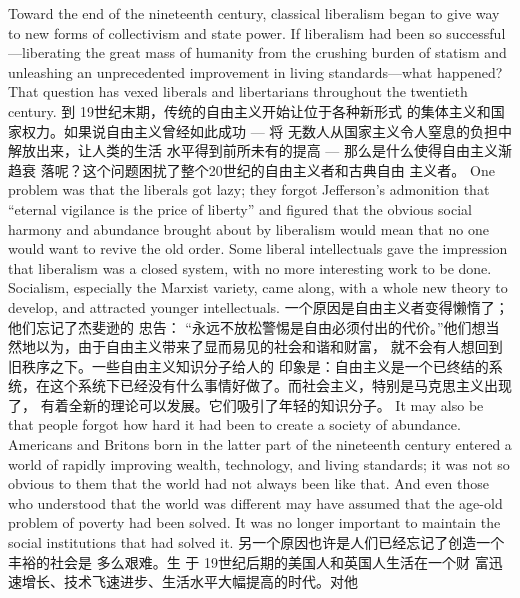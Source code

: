 \begin{paracol}{2}
Toward the end of the nineteenth century, classical liberalism
began to give way to new forms of collectivism and state power.
If liberalism had been so successful---liberating the great mass
of humanity from the crushing burden of statism and unleashing an unprecedented improvement in living standards---what
happened? That question has vexed liberals and libertarians
throughout the twentieth century.
\switchcolumn
到 19世纪末期，传统的自由主义开始让位于各种新形式
的集体主义和国家权力。如果说自由主义曾经如此成功 --- 将
无数人从国家主义令人窒息的负担中解放出来，让人类的生活
水平得到前所未有的提高 --- 那么是什么使得自由主义渐趋衰
落呢？这个问题困扰了整个20世纪的自由主义者和古典自由
主义者。
\switchcolumn*
One problem was that the liberals got lazy; they forgot Jefferson's admonition that ``eternal vigilance is the price of liberty'' and figured that the obvious social harmony and
abundance brought about by liberalism would mean that no
one would want to revive the old order. Some liberal intellectuals gave the impression that liberalism was a closed system,
with no more interesting work to be done. Socialism, especially
the Marxist variety, came along, with a whole new theory to develop, and attracted younger intellectuals.
\switchcolumn
一个原因是自由主义者变得懒惰了；他们忘记了杰斐逊的
忠告： “永远不放松警惕是自由必须付出的代价。”他们想当
然地以为，由于自由主义带来了显而易见的社会和谐和财富，
就不会有人想回到旧秩序之下。一些自由主义知识分子给人的
印象是：自由主义是一个已终结的系统，在这个系统下已经没有什么事情好做了。而社会主义，特别是马克思主义出现了，
有着全新的理论可以发展。它们吸引了年轻的知识分子。
\switchcolumn*
It may also be that people forgot how hard it had been to create a society of abundance. Americans and Britons born in the
latter part of the nineteenth century entered a world of rapidly
improving wealth, technology, and living standards; it was not
so obvious to them that the world had not always been like
that. And even those who understood that the world was different may have assumed that the age-old problem of poverty had
been solved. It was no longer important to maintain the social
institutions that had solved it.
\switchcolumn
另一个原因也许是人们已经忘记了创造一个丰裕的社会是
多么艰难。生 于 19世纪后期的美国人和英国人生活在一个财
富迅速增长、技术飞速进步、生活水平大幅提高的时代。对他

\end{paracol}
